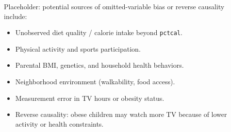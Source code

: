 \noindent Placeholder: potential sources of omitted-variable bias or reverse causality include:
\begin{itemize}
\item Unobserved diet quality / calorie intake beyond \texttt{pctcal}.
\item Physical activity and sports participation.
\item Parental BMI, genetics, and household health behaviors.
\item Neighborhood environment (walkability, food access).
\item Measurement error in TV hours or obesity status.
\item Reverse causality: obese children may watch more TV because of lower activity or health constraints.
\end{itemize}

